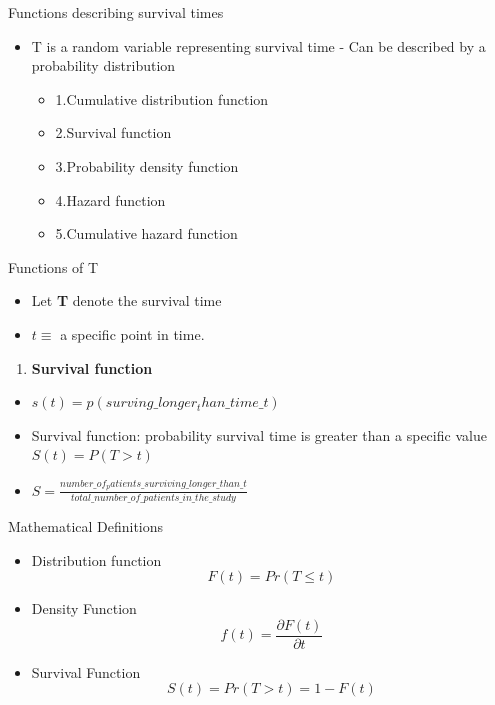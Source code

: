 \documentclass[ignorenonframetext,]{beamer}
\begin{document}
\begin{frame}{Functions describing survival times}

\begin{itemize}
\item
  T is a random variable representing survival time - Can be described
  by a probability distribution

  \begin{itemize}
  \itemsep1pt\parskip0pt
  \item
    1.Cumulative distribution function
  \item
    2.Survival function
  \item
    3.Probability density function
  \item
    4.Hazard function
  \item
    5.Cumulative hazard function
  \end{itemize}
\end{itemize}

\end{frame}

\begin{frame}{Functions of T}

\begin{itemize}
\itemsep1pt\parskip0pt
\item
  Let \textbf{T} denote the survival time
\item
  \(t \equiv\) a specific point in time.
\end{itemize}

\begin{enumerate}
\def\labelenumi{\arabic{enumi}.}
\itemsep1pt\parskip0pt
\item
  \textbf{Survival function}
\end{enumerate}

\begin{itemize}
\item
  \(s(t)=p(surving\_longer_than\_time\_t)\)
\item
  Survival function: probability survival time is greater than a
  specific value \(S(t)=P(T>t)\)
\item
  \(S=\frac{number\_of_patients\_surviving\_longer\_than\_t}{total\_number\_of\_patients\_in\_the\_study}\)
\end{itemize}

\end{frame}

\begin{frame}{Mathematical Definitions}

\begin{itemize}
\item
  Distribution function \[
   F(t)=Pr(T\leq t)
  \]
\item
  Density Function \[
  f(t)=\frac{\partial{F(t)}}{\partial{t}}
  \]
\item
  Survival Function \[
  S(t)=Pr(T>t)=1-F(t)
  \]
\end{itemize}

\end{frame}
\end{document}
